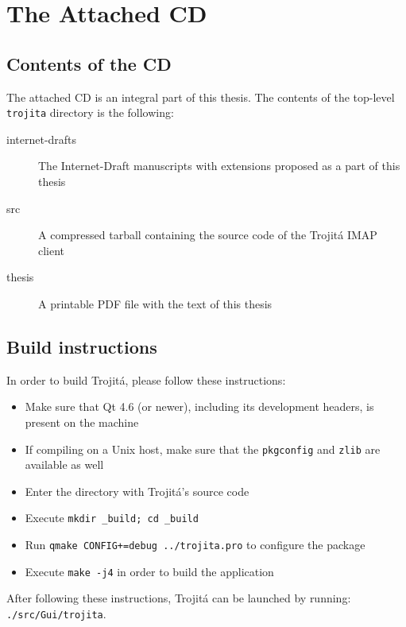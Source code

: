 \documentclass[trojita]{subfiles}
\begin{document}
\chapter{The Attached CD}
\label{sec:source-cd}

\section{Contents of the CD}

The attached CD is an integral part of this thesis.  The contents of the top-level {\tt trojita} directory is the
following:

\begin{description}
    \item[internet-drafts] The Internet-Draft manuscripts with extensions proposed as a part of this thesis
    \item[src] A compressed tarball containing the source code of the Trojitá IMAP client
    \item[thesis] A printable PDF file with the text of this thesis
\end{description}

\section{Build instructions}

In order to build Trojitá, please follow these instructions:

\begin{itemize}
  \item Make sure that Qt 4.6 (or newer), including its development headers, is present on the machine
  \item If compiling on a Unix host, make sure that the {\tt pkgconfig} and {\tt zlib} are available as well
  \item Enter the directory with Trojitá's source code
  \item Execute {\tt mkdir \_build; cd \_build}
  \item Run {\tt qmake CONFIG+=debug ../trojita.pro} to configure the package
  \item Execute {\tt make -j4} in order to build the application
\end{itemize}

After following these instructions, Trojitá can be launched by running: \\ 
{\tt ./src/Gui/trojita}.
\end{document}
